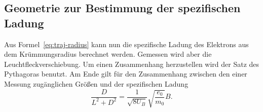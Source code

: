 \subsection{Geometrie zur Bestimmung der spezifischen Ladung}

Aus Formel~\eqref{eq:traj-radius} kann nun die spezifische Ladung des
Elektrons aus dem Krümmungsradius berechnet werden. Gemessen wird aber
die Leuchtfleckverschiebung. Um einen Zusammenhang herzustellen wird der
Satz des Pythagoras benutzt. Am Ende gilt für den Zusammenhang zwischen
den einer Messung zugänglichen Größen und der spezifischen Ladung
%
\begin{equation}
  \label{eq:spec-charge-measurement}
  \frac{D}{L^2+D^2} = \frac{1}{\sqrt{8U_B}} \sqrt{\frac{e_0}{m_0}} B.
\end{equation}
